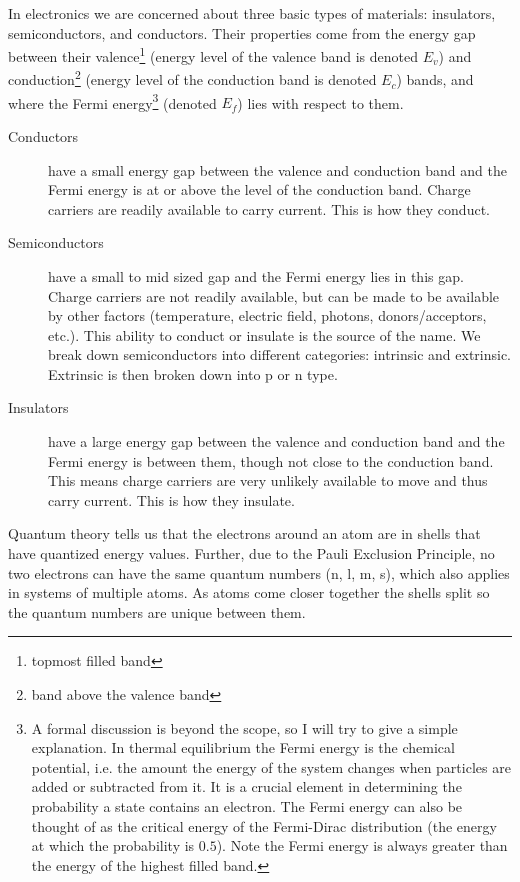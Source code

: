 In electronics we are concerned about three basic types of materials: insulators, semiconductors, and conductors.  Their properties come from the energy gap between their valence\footnote{topmost filled band} (energy level of the valence band is denoted $E_v$) and conduction\footnote{band above the valence band} (energy level of the conduction band is denoted $E_c$) bands, and where the Fermi energy\footnote{A formal discussion is beyond the scope, so I will try to give a simple explanation.  In thermal equilibrium the Fermi energy is the chemical potential, i.e. the amount the energy of the system changes when particles are added or subtracted from it.  It is a crucial element in determining the probability a state contains an electron.  The Fermi energy can also be thought of as the critical energy of the Fermi-Dirac distribution (the energy at which the probability is $0.5$).  Note the Fermi energy is always greater than the energy of the highest filled band.} (denoted $E_f$) lies with respect to them.
\begin{description}
  \item[Conductors] have a small energy gap between the valence and conduction band and the Fermi energy is at or above the level of the conduction band.  Charge carriers are readily available to carry current.  This is how they conduct.
  \item[Semiconductors] have a small to mid sized gap and the Fermi energy lies in this gap.  Charge carriers are not readily available, but can be made to be available by other factors (temperature, electric field, photons, donors/acceptors, etc.).  This ability to conduct or insulate is the source of the name.  We break down semiconductors into different categories: intrinsic and extrinsic.  Extrinsic is then broken down into p or n type.
  \item[Insulators] have a large energy gap between the valence and conduction band and the Fermi energy is between them, though not close to the conduction band.  This means charge carriers are very unlikely available to move and thus carry current.  This is how they insulate.
\end{description}
Quantum theory tells us that the electrons around an atom are in shells that have quantized energy values.  Further, due to the Pauli Exclusion Principle, no two electrons can have the same quantum numbers (n, l, m, s), which also applies in systems of multiple atoms.  As atoms come closer together the shells split so the quantum numbers are unique between them.


